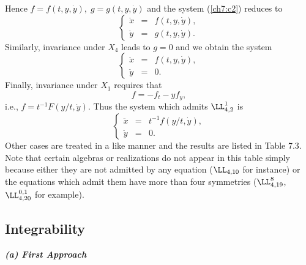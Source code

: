 Hence $f=f(t,y,\dot y),\;g=g(t,y,\dot y)$ and the system (\ref{ch7:c2})
reduces to
\begin{equation} \label{ch7:c3} \left \{ \begin{array}{lll} \ddot x &= &
f(t,y,\dot y),\\ \ddot y &= & g(t,y,\dot y). \end{array} \right.
\end{equation} Similarly, invariance under $X_4$ leads to  $g=0$ and we
obtain the system \begin{equation} \label{ch7:c4} \left \{ \begin{array}{lll}
\ddot x &= & f(t,y,\dot y),\\ \ddot y &= & 0. \end{array} \right.
\end{equation} Finally, invariance under $X_1$ requires that
\[f=-f_t-yf_y,\] i.e.,  $f=t^{-1}F(y/t,\dot y)$. Thus the system which
admits $\LL_{4,2}^1$ is \begin{equation} \label{ch7:c5} \left \{
\begin{array}{lll} \ddot x &= &t^{-1} f(y/t,\dot y),\\ \ddot y &= & 0.
\end{array} \right. \end{equation} Other cases are treated in a like manner
and
the results are listed in Table 7.3. Note that certain  algebras
or realizations do not appear in this table simply because either they
are not admitted by any equation ($\LL_{4,10}$ for instance) or the
equations which admit them have more than four symmetries ($\LL_{4,19}^8$,
$\LL_{4,20}^{0,1}$ for example).

\subsection{Integrability}

{\bf \em  (a) First Approach}

